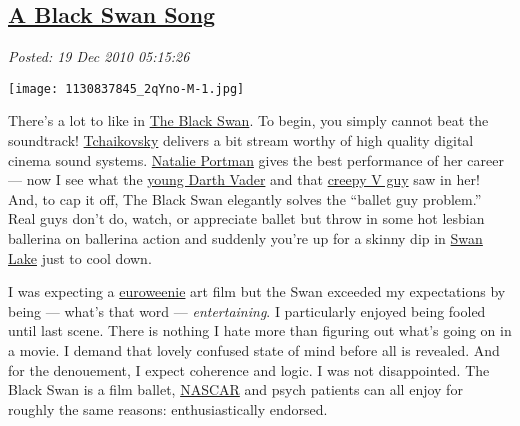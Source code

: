 %

\subsection*{\href{http://bakerjd99.wordpress.com/2010/12/19/a-black-swan-song/}{A Black Swan Song}}


\noindent\emph{Posted: 19 Dec 2010 05:15:26}
\vspace{6pt}

\captionsetup[floatingfigure]{labelformat=empty}
\begin{floatingfigure}[l]{0.23\textwidth}
\centering
\texttt{[image: 1130837845\_2qYno-M-1.jpg]}
\label{fig:985X0}
\end{floatingfigure}There's a lot to like in
\href{http://www.foxsearchlight.com/blackswan/}{The Black Swan}. To
begin, you simply cannot beat the soundtrack!
\href{http://www.classical.net/music/comp.lst/tchaikovsky.php}{Tchaikovsky}
delivers a bit stream worthy of high quality digital cinema sound
systems. \href{http://www.natalieportman.com/}{Natalie Portman} gives
the best performance of her career --- now I see what the
\href{http://www.starwars.com/databank/character/anakinskywalker/}{young
Darth Vader} and that
\href{http://www.rottentomatoes.com/m/v\_for\_vendetta/}{creepy V guy}
saw in her! And, to cap it off, The Black Swan elegantly solves the
``ballet guy problem.'' Real guys don't do, watch, or appreciate ballet
but throw in some hot lesbian ballerina on ballerina action and suddenly
you're up for a skinny dip in
\href{http://www.youtube.com/watch?v=3bYTomI-Uiw}{Swan Lake} just to
cool down.

I was expecting a
\href{http://www.urbandictionary.com/define.php?term=euroweenie}{euroweenie}
art film but the Swan exceeded my expectations by being --- what's that
word --- \emph{entertaining}. I particularly enjoyed being fooled until
last scene. There is nothing I hate more than figuring out what's going
on in a movie. I demand that lovely confused state of mind before all is
revealed. And for the denouement, I expect coherence and logic. I was
not disappointed. The Black Swan is a film ballet,
\href{http://auto-racing.speedtv.com/article/alms-black-swan-confirms-porsche-gt-entry/}{NASCAR}
and psych patients can all enjoy for roughly the same reasons:
enthusiastically endorsed.




%